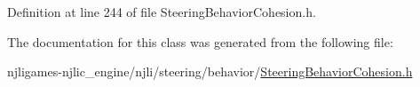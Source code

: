 Definition at line 244 of file Steering\+Behavior\+Cohesion.\+h.



The documentation for this class was generated from the following file\+:\begin{DoxyCompactItemize}
\item 
njligames-\/njlic\+\_\+engine/njli/steering/behavior/\mbox{\hyperlink{_steering_behavior_cohesion_8h}{Steering\+Behavior\+Cohesion.\+h}}\end{DoxyCompactItemize}
